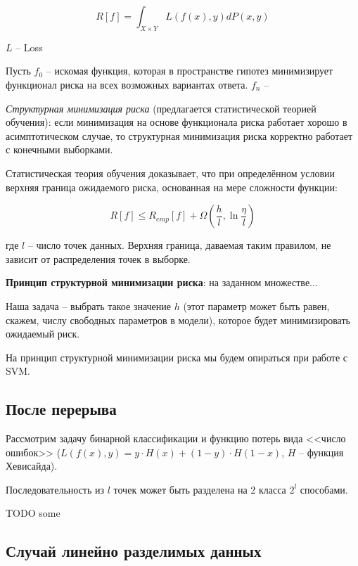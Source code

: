 \documentclass[main.tex]{subfiles}
\begin{document}
\[ R[f] = \int_{X \times Y} L(f(x), y) dP(x,y) \]

$ L $ -- Loss

Пусть $ f_0 $ -- искомая функция, которая в пространстве гипотез минимизирует функционал риска на всех возможных вариантах ответа.
$f_n$ -- 

\emph{Структурная минимизация риска} (предлагается статистической теорией обучения): если минимизация на основе функционала риска работает хорошо в асимптотическом случае, то структурная минимизация риска корректно работает с конечными выборками.


Статистическая теория обучения доказывает, что при определённом условии верхняя граница ожидаемого риска, основанная на мере сложности функции:

\[ R[f] \le R_{emp}[f] + \Omega\left( \frac{h}{l}, \ln \frac{\eta}{l} \right) \]

где $ l $ -- число точек данных.
Верхняя граница, даваемая таким правилом, не зависит от распределения точек в выборке.

\textbf{Принцип структурной минимизации риска}: на заданном множестве...

Наша задача -- выбрать такое значение  $ h $ (этот параметр может быть равен, скажем, числу свободных параметров в модели), которое будет минимизировать ожидаемый риск.

На принцип структурной минимизации риска мы будем опираться при работе с  SVM.

\subsection{После перерыва}

Рассмотрим задачу бинарной классификации и функцию потерь вида <<число ошибок>> ($ L(f(x),y) = y \cdot H(x) + (1-y) \cdot H(1-x) $, $ H $ --  функция Хевисайда).

Последовательность из $ l $ точек может быть разделена на 2 класса $ 2^l $ способами.


\begin{leftbar}
	TODO some
\end{leftbar}

\subsection{Случай линейно разделимых данных}
\end{document}
